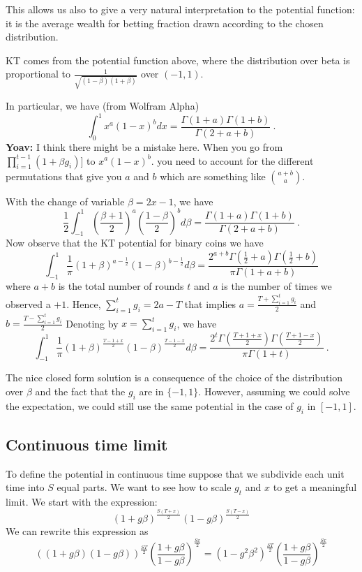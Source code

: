 \documentclass{article}
\begin{document}
This allows us also to give a very natural interpretation to the potential function: it is the average wealth for betting fraction drawn according to the chosen distribution.

KT comes from the potential function above, where the distribution over beta is proportional to $\frac{1}{\sqrt{(1-\beta)(1+\beta)}}$ over $(-1,1)$. 

In particular, we have (from Wolfram Alpha)
\[
\int_0^1 x^a (1-x)^b dx
= \frac{\Gamma(1 + a) \Gamma(1 + b)}{\Gamma(2 + a + b)}~.
\]
{\bf Yoav:} I think there might be a mistake here. When you go from $\prod_{i=1}^{t-1}(1+\beta g_i)]$ to $x^a (1-x)^b$. you need to account for the different permutations that give you $a$ and $b$ which are something like ${a+b \choose a}$.

With the change of variable $\beta=2x-1$, we have
\[
\frac{1}{2}\int_{-1}^1 \left(\frac{\beta+1}{2}\right)^a \left(\frac{1-\beta}{2}\right)^b d\beta
= \frac{\Gamma(1 + a) \Gamma(1 + b)}{\Gamma(2 + a + b)}~.
\]
Now observe that the KT potential for binary coins we have
\[
\int_{-1}^1 \frac{1}{\pi} (1+\beta)^{a-\frac{1}{2}} (1-\beta)^{b-\frac{1}{2}} d\beta
= \frac{2^{a+b} \Gamma(\frac{1}{2} + a) \Gamma(\frac{1}{2} + b)}{  \pi \Gamma(1 + a + b)}
\]
where $a+b$ is the total number of rounds $t$ and $a$ is the number of times we observed a $+1$. Hence, $\sum_{i=1}^t g_i= 2a-T$ that implies $a=\frac{T+\sum_{i=1}^t g_i}{2}$ and $b=\frac{T-\sum_{i=1}^t g_i}{2}$
Denoting by $x=\sum_{i=1}^t g_i$, we have
\[
\int_{-1}^1 \frac{1}{\pi} (1+\beta)^{\frac{T-1+x}{2}} (1-\beta)^{\frac{T-1-x}{2}} d\beta
= \frac{2^{t} \Gamma(\frac{T+1+x}{2}) \Gamma(\frac{T+1-x}{2})}{  \pi \Gamma(1 + t)}~.
\]

The nice closed form solution is a consequence of the choice of the distribution over $\beta$ and the fact that the $g_i$ are in $\{-1,1\}$. However, assuming we could solve the expectation, we could still use the same potential in the case of $g_i$ in $[-1,1]$. 


\subsection{Continuous time limit}
To define the potential in continuous time suppose that we subdivide each unit time
into $S$ equal parts. We want to see how to scale $g_t$ and $x$ to get a meaningful limit. We start with the expression:
$$ (1+g\beta)^{\frac{S(T+x)}{2}} (1-g\beta)^{\frac{S(T-x)}{2}} $$
We can rewrite this expression as
$$ ((1+g\beta)(1-g\beta))^{\frac{ST}{2}} \left( \frac{1+g\beta}{1-g \beta}\right)^{\frac{Sx}{2}}
=
(1-g^2 \beta^2)^{\frac{ST}{2}} \left( \frac{1+g\beta}{1-g \beta}\right)^{\frac{Sx}{2}}
$$
\end{document}
